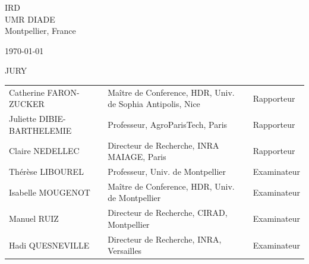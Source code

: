 \documentclass[
11pt, %
french, %
singlespacing, %
headsepline, %
]{MastersDoctoralThesis} %
\begin{document}
\begin{titlepage}
\begin{center}
\begin{center}
\Large IRD\\
\Large UMR DIADE\\
\large Montpellier, France
\end{center}
\vspace{1cm}
{\today}
\vspace{1cm}
\\

\begin{center}
	JURY
\end{center}

\footnotesize
\begin{tabular}{ l l l}
Catherine FARON-ZUCKER  & Maître de Conference, HDR, Univ. de Sophia Antipolis, Nice   & Rapporteur \\ 
Juliette DIBIE-BARTHELEMIE & Professeur, AgroParisTech, Paris & Rapporteur \\ 
Claire NEDELLEC  & Directeur de Recherche, INRA MAIAGE, Paris & Rapporteur \\ 
Thérèse LIBOUREL & Professeur, Univ. de Montpellier  & Examinateur \\ 
Isabelle MOUGENOT & Maître de Conference, HDR, Univ. de Montpellier  & Examinateur \\ 
Manuel RUIZ & Directeur de Recherche, CIRAD, Montpellier & Examinateur \\ 
Hadi QUESNEVILLE & Directeur de Recherche, INRA, Versailles & Examinateur \\ 
\end{tabular}
\normalsize

\vfill
\end{center}
\end{titlepage}





\end{document}
